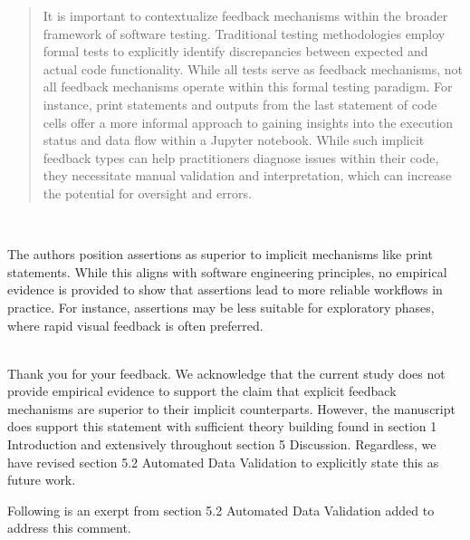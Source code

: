 \documentclass[11pt,fleqn]{article}
\newcommand{\eline}{\vspace*{.75\baselineskip}}
\newcommand{\Referee}[1]{\eline \noindent {\bf Reviewer comment #1:} \\}
\newcommand{\Us}{\eline \noindent {\bf Response:}\\}
\newenvironment{revcomment}[1][]
{\Referee{#1}\begin{rcomment}}
{\end{rcomment}}
\begin{document}
\begin{quote}
  It is important to contextualize feedback mechanisms within the broader framework of software testing. Traditional testing methodologies employ formal tests to explicitly identify discrepancies between expected and actual code functionality. While all tests serve as feedback mechanisms, not all feedback mechanisms operate within this formal testing paradigm. For instance, print statements and outputs from the last statement of code cells offer a more informal approach to gaining insights into the execution status and data flow within a Jupyter notebook. While such implicit feedback types can help practitioners diagnose issues within their code, they necessitate manual validation and interpretation, which can increase the potential for oversight and errors.
\end{quote}

\begin{revcomment}[2.9]
  The authors position assertions as superior to implicit mechanisms like print statements. While this aligns with software engineering principles, no empirical evidence is provided to show that assertions lead to more reliable workflows in practice. For instance, assertions may be less suitable for exploratory phases, where rapid visual feedback is often preferred.
\end{revcomment}

\Us Thank you for your feedback. We acknowledge that the current study does not provide empirical evidence to support the claim that explicit feedback mechanisms are superior to their implicit counterparts. However, the manuscript does support this statement with sufficient theory building found in section 1 Introduction and extensively throughout section 5 Discussion. Regardless, we have revised section 5.2 Automated Data Validation to explicitly state this as future work.

Following is an exerpt from section 5.2 Automated Data Validation added to address this comment.
\end{document}
